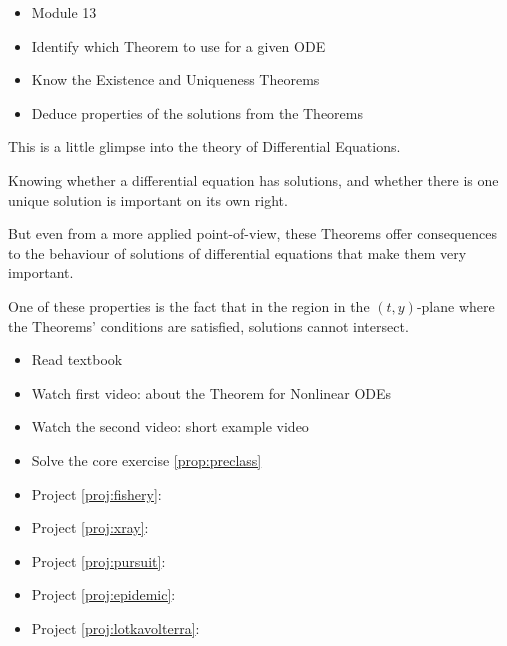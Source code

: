 \begin{lesson}

	\begin{itemize}
		\item Module 13
	\end{itemize}

	\begin{itemize}
		\item Identify which Theorem to use for a given ODE
		\item Know the Existence and Uniqueness Theorems
		\item Deduce properties of the solutions from the Theorems
	\end{itemize}
	

This is a little glimpse into the theory of Differential Equations. 

Knowing whether a differential equation has solutions, and whether there is one unique solution is important on its own right.

But even from a more applied point-of-view, these Theorems offer consequences to the behaviour of solutions of differential equations that make them very important. 

One of these properties is the fact that in the region in the $(t,y)$-plane where the Theorems' conditions are satisfied, solutions cannot intersect.


\begin{itemize}
	\item Read textbook
	\item Watch first video: about the Theorem for Nonlinear ODEs
	\item Watch the second video: short example video
	\item Solve the core exercise \ref{prop:preclass}
\end{itemize}


\begin{itemize}
	\item Project \ref{proj:fishery}: \fisherytitle
	\item Project \ref{proj:xray}: \xraytitle
	\item Project \ref{proj:pursuit}: \pursuittitle
	\item Project \ref{proj:epidemic}: \epidemictitle
	\item Project \ref{proj:lotkavolterra}: \lotkavolterratitle
\end{itemize}

\end{lesson}





